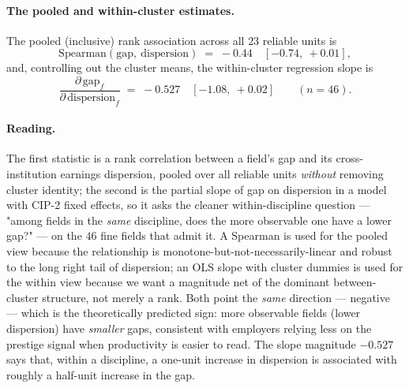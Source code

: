 \documentclass[11pt]{article}
\begin{document}
\paragraph{The pooled and within-cluster estimates.} The pooled (inclusive) rank association across all $23$ reliable units is
\[
\mathrm{Spearman}\!\left(\mathrm{gap},\ \text{dispersion}\right) \;=\; -0.44 \quad [-0.74,\ +0.01],
\]
and, controlling out the cluster means, the within-cluster regression slope is
\[
\frac{\partial\,\mathrm{gap}_f}{\partial\,\text{dispersion}_f}\;=\;-0.527 \quad [-1.08,\ +0.02] \qquad (n=46).
\]

\paragraph{Reading.} The first statistic is a rank correlation between a field's gap and its cross-institution earnings dispersion, pooled over all reliable units \emph{without} removing cluster identity; the second is the partial slope of gap on dispersion in a model with CIP-2 fixed effects, so it asks the cleaner within-discipline question --- "among fields in the \emph{same} discipline, does the more observable one have a lower gap?" --- on the $46$ fine fields that admit it. A Spearman is used for the pooled view because the relationship is monotone-but-not-necessarily-linear and robust to the long right tail of dispersion; an OLS slope with cluster dummies is used for the within view because we want a magnitude net of the dominant between-cluster structure, not merely a rank. Both point the \emph{same} direction --- negative --- which is the theoretically predicted sign: more observable fields (lower dispersion) have \emph{smaller} gaps, consistent with employers relying less on the prestige signal when productivity is easier to read. The slope magnitude $-0.527$ says that, within a discipline, a one-unit increase in dispersion is associated with roughly a half-unit increase in the gap.
\end{document}
